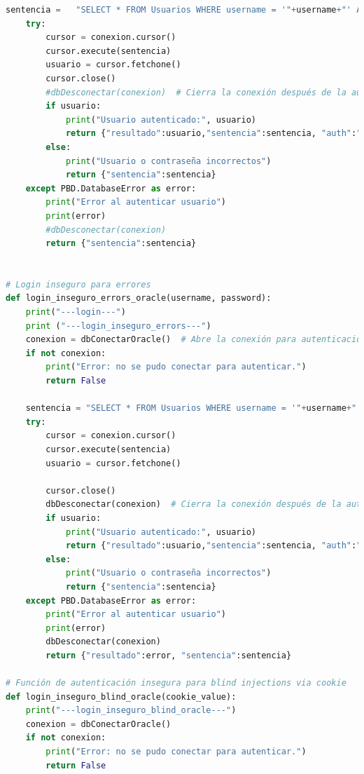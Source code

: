 \documentclass[a4paper,12pt]{article}
\begin{document}
\begin{lstlisting}[language=Python]
    sentencia =   "SELECT * FROM Usuarios WHERE username = '"+username+"' AND password = '"+password+"'"
    try:
        cursor = conexion.cursor()
        cursor.execute(sentencia)
        usuario = cursor.fetchone()
        cursor.close()
        #dbDesconectar(conexion)  # Cierra la conexión después de la autenticación
        if usuario:
            print("Usuario autenticado:", usuario)
            return {"resultado":usuario,"sentencia":sentencia, "auth":"true"}
        else:
            print("Usuario o contraseña incorrectos")
            return {"sentencia":sentencia}
    except PBD.DatabaseError as error:
        print("Error al autenticar usuario")
        print(error)
        #dbDesconectar(conexion)
        return {"sentencia":sentencia}


# Login inseguro para errores
def login_inseguro_errors_oracle(username, password):
    print("---login---")
    print ("---login_inseguro_errors---")
    conexion = dbConectarOracle()  # Abre la conexión para autenticación
    if not conexion:
        print("Error: no se pudo conectar para autenticar.")
        return False

    sentencia = "SELECT * FROM Usuarios WHERE username = '"+username+"' AND password = '"+password+"'"
    try:
        cursor = conexion.cursor()
        cursor.execute(sentencia)
        usuario = cursor.fetchone()

        cursor.close()
        dbDesconectar(conexion)  # Cierra la conexión después de la autenticación
        if usuario:
            print("Usuario autenticado:", usuario)
            return {"resultado":usuario,"sentencia":sentencia, "auth":"true"}
        else:
            print("Usuario o contraseña incorrectos")
            return {"sentencia":sentencia}
    except PBD.DatabaseError as error:
        print("Error al autenticar usuario")
        print(error)
        dbDesconectar(conexion)
        return {"resultado":error, "sentencia":sentencia}

# Función de autenticación insegura para blind injections via cookie
def login_inseguro_blind_oracle(cookie_value):
    print("---login_inseguro_blind_oracle---")
    conexion = dbConectarOracle()
    if not conexion:
        print("Error: no se pudo conectar para autenticar.")
        return False


\end{lstlisting}
\end{document}
